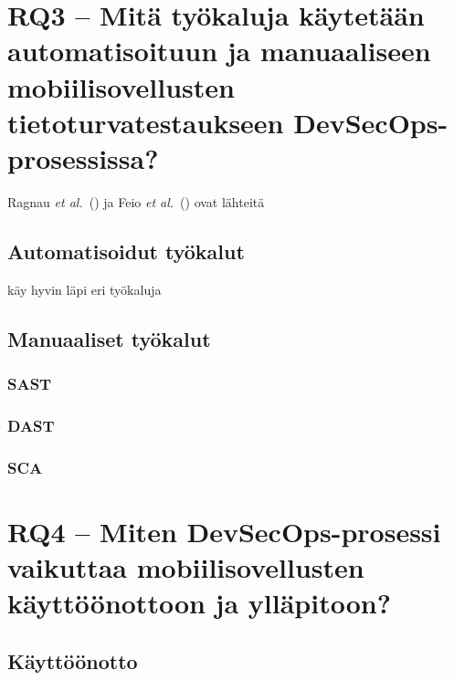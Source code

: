 \documentclass[bscthesis,finnish,oneside,biblatex]{uefcsthesis}
\begin{document}
\section{RQ3 – Mitä työkaluja käytetään automatisoituun ja manuaaliseen mobiilisovellusten tietoturvatestaukseen DevSecOps-prosessissa?}
\label{sec:rq3}

Ragnau \emph{et al.}\ (\citeyear{rangnau2020_cst}) ja
Feio \emph{et al.}\ (\citeyear{feio2024_empirical}) ovat lähteitä

\subsection{Automatisoidut työkalut}

\cite{feio2024_empirical} käy hyvin läpi eri työkaluja

\subsection{Manuaaliset työkalut}

\subsubsection{SAST}

\subsubsection{DAST}

\subsubsection{SCA}

\section{RQ4 – Miten DevSecOps-prosessi vaikuttaa mobiilisovellusten käyttöönottoon ja ylläpitoon?}
\label{sec:rq4}


\subsection{Käyttöönotto}

\end{document}
